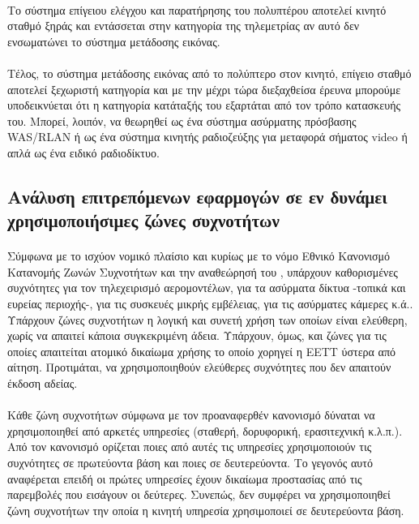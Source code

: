 \documentclass[a4paper, 12pt, twoside]{report}
\begin{document}
{{{{{{			\paragraph{}{Το σύστημα επίγειου ελέγχου και παρατήρησης του πολυπτέρου αποτελεί κινητό σταθμό ξηράς και εντάσσεται στην κατηγορία της τηλεμετρίας αν αυτό δεν ενσωματώνει το σύστημα μετάδοσης εικόνας.
			}
			\paragraph{}{Τέλος, το σύστημα μετάδοσης εικόνας από το πολύπτερο στον κινητό, επίγειο σταθμό αποτελεί ξεχωριστή κατηγορία και με την μέχρι τώρα διεξαχθείσα έρευνα μπορούμε υποδεικνύεται ότι η κατηγορία κατάταξής του εξαρτάται από τον τρόπο κατασκευής του. Μπορεί, λοιπόν, να θεωρηθεί ως ένα σύστημα ασύρματης πρόσβασης WAS/RLAN ή ως ένα σύστημα κινητής ραδιοζεύξης για μεταφορά σήματος video ή απλά ως ένα ειδικό ραδιοδίκτυο.
			}
			
		\subsection{Ανάλυση επιτρεπόμενων εφαρμογών σε εν δυνάμει χρησιμοποιήσιμες ζώνες συχνοτήτων}
			
			\paragraph{}{Σύμφωνα με το ισχύον νομικό πλαίσιο και κυρίως με το νόμο Εθνικό Κανονισμό Κατανομής Ζωνών Συχνοτήτων \cite{ΦΕΚ2006Β399} και την αναθεώρησή του \cite{ΦΕΚ2008Β1979}, υπάρχουν καθορισμένες συχνότητες για τον τηλεχειρισμό αερομοντέλων, για τα ασύρματα δίκτυα -τοπικά και ευρείας περιοχής-, για τις συσκευές μικρής εμβέλειας, για τις ασύρματες κάμερες κ.ά.. Υπάρχουν ζώνες συχνοτήτων η λογική και συνετή χρήση των οποίων είναι ελεύθερη, χωρίς να απαιτεί κάποια συγκεκριμένη άδεια. Υπάρχουν, όμως, και ζώνες για τις οποίες απαιτείται ατομικό δικαίωμα χρήσης το οποίο χορηγεί η ΕΕΤΤ ύστερα από αίτηση. Προτιμάται, να χρησιμοποιηθούν ελεύθερες συχνότητες που δεν απαιτούν έκδοση αδείας.
			}
			\paragraph{}{Κάθε ζώνη συχνοτήτων σύμφωνα με τον προαναφερθέν κανονισμό δύναται να χρησιμοποιηθεί από αρκετές υπηρεσίες (σταθερή, δορυφορική, ερασιτεχνική κ.λ.π.). Από τον κανονισμό ορίζεται ποιες από αυτές τις υπηρεσίες χρησιμοποιούν τις συχνότητες σε πρωτεύοντα βάση και ποιες σε δευτερεύοντα. Το γεγονός αυτό αναφέρεται επειδή οι πρώτες υπηρεσίες έχουν δικαίωμα προστασίας από τις παρεμβολές που εισάγουν οι δεύτερες. Συνεπώς, δεν συμφέρει να χρησιμοποιηθεί ζώνη συχνοτήτων την οποία η κινητή υπηρεσία χρησιμοποιεί σε δευτερεύοντα βάση.
			}
}}}}}}
\end{document}

